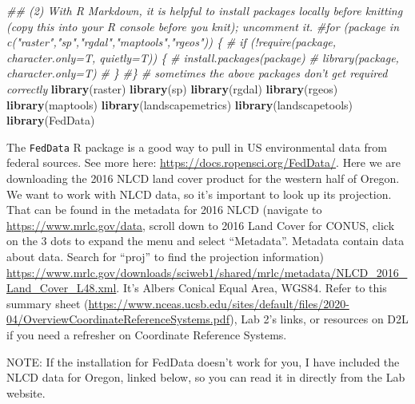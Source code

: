 \documentclass[
]{article}
\newenvironment{Shaded}{\begin{snugshade}}{\end{snugshade}}
\newcommand{\CommentTok}[1]{\textcolor[rgb]{0.56,0.35,0.01}{\textit{#1}}}
\newcommand{\KeywordTok}[1]{\textcolor[rgb]{0.13,0.29,0.53}{\textbf{#1}}}
\newcommand{\NormalTok}[1]{#1}
\begin{document}
\begin{Shaded}
\begin{Highlighting}[]
\CommentTok{## (2) With R Markdown, it is helpful to install packages locally before knitting (copy this into your R console before you knit); uncomment it.}
\CommentTok{#for (package in c("raster","sp","rgdal","maptools","rgeos")) \{}
\CommentTok{#  if (!require(package, character.only=T, quietly=T)) \{}
\CommentTok{#    install.packages(package)}
\CommentTok{#    library(package, character.only=T)}
\CommentTok{#  \}}
\CommentTok{#\}}
\CommentTok{# sometimes the above packages don't get required correctly}
\KeywordTok{library}\NormalTok{(raster)}
\KeywordTok{library}\NormalTok{(sp)}
\KeywordTok{library}\NormalTok{(rgdal)}
\KeywordTok{library}\NormalTok{(rgeos)}
\KeywordTok{library}\NormalTok{(maptools)}
\KeywordTok{library}\NormalTok{(landscapemetrics)}
\KeywordTok{library}\NormalTok{(landscapetools)}
\KeywordTok{library}\NormalTok{(FedData)}
\end{Highlighting}
\end{Shaded}

The \texttt{FedData} R package is a good way to pull in US environmental
data from federal sources. See more here:
\url{https://docs.ropensci.org/FedData/}. Here we are downloading the
2016 NLCD land cover product for the western half of Oregon. We want to
work with NLCD data, so it's important to look up its projection. That
can be found in the metadata for 2016 NLCD (navigate to
\url{https://www.mrlc.gov/data}, scroll down to 2016 Land Cover for
CONUS, click on the 3 dots to expand the menu and select ``Metadata''.
Metadata contain data about data. Search for ``proj'' to find the
projection information)
\url{https://www.mrlc.gov/downloads/sciweb1/shared/mrlc/metadata/NLCD_2016_Land_Cover_L48.xml}.
It's Albers Conical Equal Area, WGS84. Refer to this summary sheet
(\url{https://www.nceas.ucsb.edu/sites/default/files/2020-04/OverviewCoordinateReferenceSystems.pdf}),
Lab 2's links, or resources on D2L if you need a refresher on Coordinate
Reference Systems.

NOTE: If the installation for FedData doesn't work for you, I have
included the NLCD data for Oregon, linked below, so you can read it in
directly from the Lab website.
\end{document}
